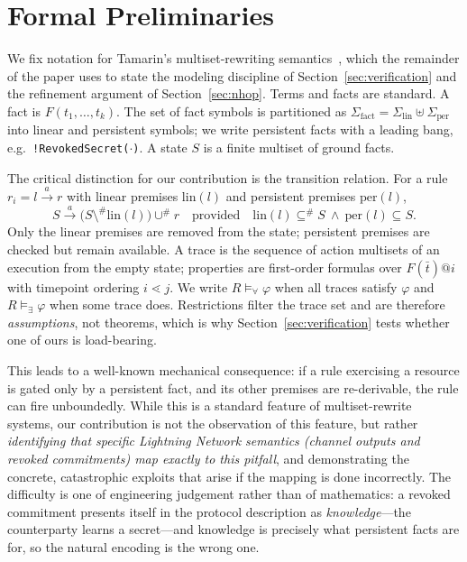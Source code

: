 \documentclass[sigconf,review]{acmart}
\theoremstyle{acmdefinition}
\begin{document}
\section{Formal Preliminaries}
\label{sec:preliminaries}

We fix notation for Tamarin's multiset-rewriting semantics~\cite{meier2013tamarin}, which the remainder of the paper uses to state the modeling discipline of Section~\ref{sec:verification} and the refinement argument of Section~\ref{sec:nhop}. Terms and facts are standard. A fact is $F(t_1, \ldots, t_k)$. The set of fact symbols is partitioned as $\Sigma_{\text{fact}} = \Sigma_{\text{lin}} \uplus \Sigma_{\text{per}}$ into linear and persistent symbols; we write persistent facts with a leading bang, e.g.\ \texttt{!RevokedSecret($\cdot$)}. A state $S$ is a finite multiset of ground facts.

The critical distinction for our contribution is the transition relation. For a rule $r_i = l \xrightarrow{a} r$ with linear premises $\mathrm{lin}(l)$ and persistent premises $\mathrm{per}(l)$,
\[
S \xrightarrow{\;a\;} \bigl(S \setminus^{\#} \mathrm{lin}(l)\bigr) \cup^{\#} r
\quad\text{provided}\quad
\mathrm{lin}(l) \subseteq^{\#} S \ \wedge\ \mathrm{per}(l) \subseteq S .
\]
Only the linear premises are removed from the state; persistent premises are checked but remain available. A trace is the sequence of action multisets of an execution from the empty state; properties are first-order formulas over $F(\bar t)@i$ with timepoint ordering $i \lessdot j$. We write $R \models_{\forall} \varphi$ when all traces satisfy $\varphi$ and $R \models_{\exists} \varphi$ when some trace does. Restrictions filter the trace set and are therefore \emph{assumptions}, not theorems, which is why Section~\ref{sec:verification} tests whether one of ours is load-bearing.

This leads to a well-known mechanical consequence: if a rule exercising a resource is gated only by a persistent fact, and its other premises are re-derivable, the rule can fire unboundedly. While this is a standard feature of multiset-rewrite systems, our contribution is not the observation of this feature, but rather \emph{identifying that specific Lightning Network semantics (channel outputs and revoked commitments) map exactly to this pitfall}, and demonstrating the concrete, catastrophic exploits that arise if the mapping is done incorrectly. The difficulty is one of engineering judgement rather than of mathematics: a revoked commitment presents itself in the protocol description as \emph{knowledge}---the counterparty learns a secret---and knowledge is precisely what persistent facts are for, so the natural encoding is the wrong one.
\end{document}
